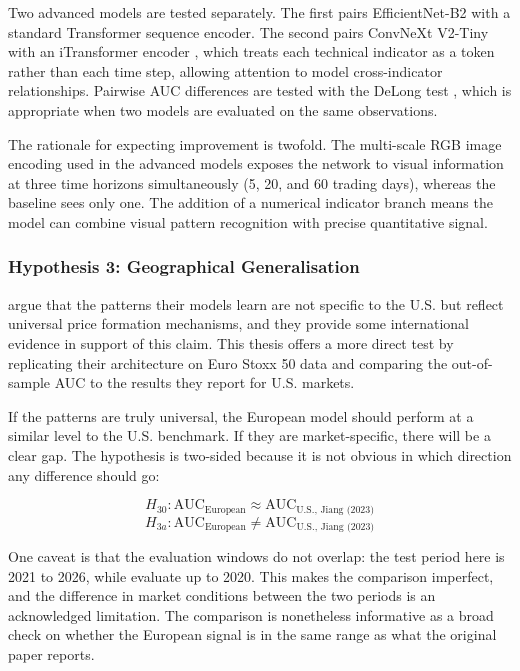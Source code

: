Two advanced models are tested separately. The first pairs EfficientNet-B2 with a standard Transformer sequence encoder. The second pairs ConvNeXt V2-Tiny with an iTransformer encoder \parencite{liu2024itransformer}, which treats each technical indicator as a token rather than each time step, allowing attention to model cross-indicator relationships. Pairwise AUC differences are tested with the DeLong test \parencite{delong1988}, which is appropriate when two models are evaluated on the same observations.

The rationale for expecting improvement is twofold. The multi-scale RGB image encoding used in the advanced models exposes the network to visual information at three time horizons simultaneously (5, 20, and 60 trading days), whereas the baseline sees only one. The addition of a numerical indicator branch means the model can combine visual pattern recognition with precise quantitative signal.

\subsubsection*{Hypothesis 3: Geographical Generalisation}

\textcite{Jiang2023} argue that the patterns their models learn are not specific to the U.S. but reflect universal price formation mechanisms, and they provide some international evidence in support of this claim. This thesis offers a more direct test by replicating their architecture on Euro Stoxx 50 data and comparing the out-of-sample AUC to the results they report for U.S. markets.

If the patterns are truly universal, the European model should perform at a similar level to the U.S. benchmark. If they are market-specific, there will be a clear gap. The hypothesis is two-sided because it is not obvious in which direction any difference should go:

\begin{equation}
  H_{30}: \text{AUC}_{\text{European}} \approx \text{AUC}_{\text{U.S., Jiang (2023)}}
\end{equation}
\begin{equation}
  H_{3a}: \text{AUC}_{\text{European}} \neq \text{AUC}_{\text{U.S., Jiang (2023)}}
\end{equation}

One caveat is that the evaluation windows do not overlap: the test period here is 2021 to 2026, while \textcite{Jiang2023} evaluate up to 2020. This makes the comparison imperfect, and the difference in market conditions between the two periods is an acknowledged limitation. The comparison is nonetheless informative as a broad check on whether the European signal is in the same range as what the original paper reports.

